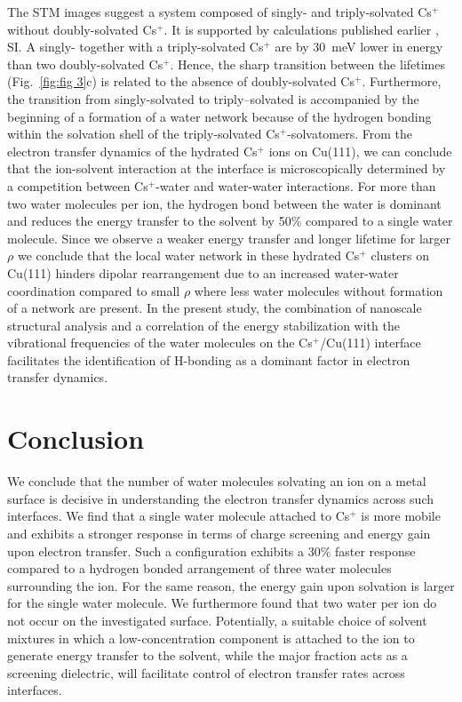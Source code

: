 \documentclass[aps,twocolumn,amssymb,amsfonts,amsmath,showpacs,final,a4paper,superscriptaddress]{revtex4-2}
\begin{document}
The STM images suggest a system composed of singly- and triply-solvated Cs$^+$ without doubly-solvated Cs$^+$. It is supported by calculations published earlier \cite{penschke_2023}, SI. A singly- together with a triply-solvated Cs$^+$ are by 30~meV lower in energy than two doubly-solvated Cs$^+$. Hence, the sharp transition between the lifetimes (Fig.\ \ref{fig:fig 3}c) is related to the absence of doubly-solvated Cs$^+$.
Furthermore, the transition from singly-solvated to triply--solvated is accompanied by the beginning of a formation of a water network because of the hydrogen bonding within the solvation shell of the triply-solvated Cs$^+$-solvatomers.
From the electron transfer dynamics of the hydrated Cs$^+$ ions on Cu(111), we can conclude that the ion-solvent interaction at the interface is microscopically determined by a competition between Cs$^+$-water and water-water interactions. For more than two water molecules per ion, the hydrogen bond between the water is dominant and reduces the energy transfer to the solvent by 50\% compared to a single water molecule. Since we observe a weaker energy transfer and longer lifetime for larger $\rho$ we conclude that the local water network in these hydrated Cs$^+$ clusters on Cu(111) hinders dipolar rearrangement due to an increased water-water coordination compared to small $\rho$ where less water molecules without formation of a network are present.  In the present study, the combination of nanoscale structural analysis and a correlation of the energy stabilization with the vibrational frequencies of the water molecules on the Cs$^+$/Cu(111) interface facilitates the identification of H-bonding as a dominant factor in electron transfer dynamics.

\section {Conclusion}

We conclude that the number of water molecules solvating an ion on a metal surface is decisive in understanding the electron transfer dynamics across such interfaces. We find that a single water molecule attached to Cs$^+$ is more mobile and exhibits a stronger response in terms of charge screening and energy gain upon electron transfer. Such a configuration exhibits a 30\% faster response compared to a hydrogen bonded arrangement of three water molecules surrounding the ion. For the same reason, the energy gain upon solvation is larger for the single water molecule. We furthermore found that two water per ion do not occur on the investigated surface. Potentially, a suitable choice of solvent mixtures in which a low-concentration component is attached to the ion to generate energy transfer to the solvent, while the major fraction acts as a screening dielectric, will facilitate control of electron transfer rates across interfaces.
\end{document}
